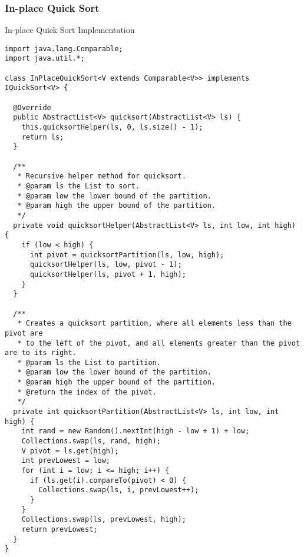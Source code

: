 \subsubsection*{In-place Quick Sort}
\begin{cl}[]{In-place Quick Sort Implementation}
\begin{lstlisting}[language=MyJava]
import java.lang.Comparable;
import java.util.*;

class InPlaceQuickSort<V extends Comparable<V>> implements IQuickSort<V> {

  @Override
  public AbstractList<V> quicksort(AbstractList<V> ls) {
    this.quicksortHelper(ls, 0, ls.size() - 1);
    return ls;
  }

  /**
   * Recursive helper method for quicksort.
   * @param ls the List to sort.
   * @param low the lower bound of the partition.
   * @param high the upper bound of the partition.
   */
  private void quicksortHelper(AbstractList<V> ls, int low, int high) {
    if (low < high) {
      int pivot = quicksortPartition(ls, low, high);
      quicksortHelper(ls, low, pivot - 1);
      quicksortHelper(ls, pivot + 1, high);
    }
  }

  /**
   * Creates a quicksort partition, where all elements less than the pivot are
   * to the left of the pivot, and all elements greater than the pivot are to its right.
   * @param ls the List to partition.
   * @param low the lower bound of the partition.
   * @param high the upper bound of the partition.
   * @return the index of the pivot.
   */
  private int quicksortPartition(AbstractList<V> ls, int low, int high) {
    int rand = new Random().nextInt(high - low + 1) + low;
    Collections.swap(ls, rand, high);
    V pivot = ls.get(high);
    int prevLowest = low;
    for (int i = low; i <= high; i++) {
      if (ls.get(i).compareTo(pivot) < 0) {
        Collections.swap(ls, i, prevLowest++);
      }
    }
    Collections.swap(ls, prevLowest, high);
    return prevLowest;
  }
}
\end{lstlisting}
\end{cl}
